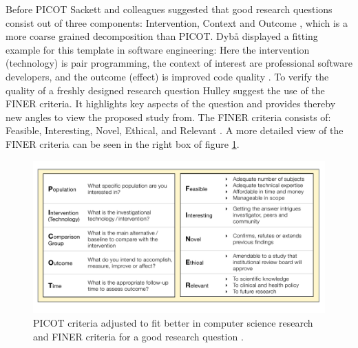 Before PICOT Sackett and colleagues suggested that good research questions consist out of three components: Intervention, Context and Outcome \cite{Sackett2000}, which is a more coarse grained decomposition than PICOT. Dyb{\aa} \etal displayed a fitting example for this template in software engineering:  \cite[p. 60]{Dyba2005} Here the intervention (technology) is pair programming, the context of interest are professional software developers, and the outcome (effect) is improved code quality \cite{Dyba2005}. To verify the quality of a freshly designed research question Hulley \etal suggest the use of the FINER criteria. It highlights key aspects of the question and provides thereby new angles to view the proposed study from. The FINER criteria consists of: Feasible, Interesting, Novel, Ethical, and Relevant \cite{Farrugia2009}. A more detailed view of the FINER criteria can be seen in the right box of figure \ref{fig:PICOT_FINER}.   

\begin{figure}
	\centering
	\includegraphics[width=12cm]{figures/picot_finer.pdf}
	\caption{PICOT criteria adjusted to fit better in computer science research \cite{Farrugia2009} and FINER criteria for a good research question \cite{Farrugia2009}.}
	\label{fig:PICOT_FINER}
\end{figure}


